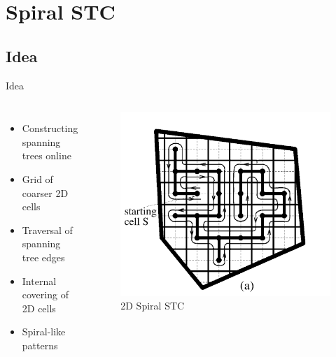 \documentclass{beamer}
\begin{document}
\section{Spiral STC}
\subsection{Idea}
\begin{frame}{Idea}
    \begin{columns}

        \begin{itemize}
            \item Constructing spanning trees online
            \item Grid of coarser 2D cells
            \item Traversal of spanning tree edges
            \item Internal covering of 2D cells
            \item Spiral-like patterns
        \end{itemize}
        \begin{figure}
            \includegraphics[width=\linewidth]{Images/fig3a.png}
            \caption{2D Spiral STC}
        \end{figure}
    \end{columns}
\end{frame}
\end{document}
